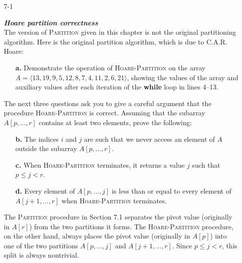 \begin{enumerate}

\item[7{-}1]{\textbf{\emph{Hoare partition correctness}}\\
The version of \textsc{Partition} given in this chapter is not the original
partitioning algorithm. Here is the original partition algorithm, which is
due to C.A.R. Hoare:

\begin{algorithm}[H]
\SetAlgoNoEnd\DontPrintSemicolon
\BlankLine
{}
\nonl{}
\end{algorithm}

\begin{enumerate}
\item[\textbf{a.}]{Demonstrate the operation of \textsc{Hoare-Partition} on the array
$A = \langle 13, 19, 9, 5, 12, 8, 7, 4, 11, 2, 6, 21 \rangle$, showing the
values of the array and auxiliary values after each iteration of the
\textbf{while} loop in lines 4{--}13.}
\end{enumerate}

The next three questions ask you to give a careful argument that the procedure
\textsc{Hoare-Partition} is correct. Assuming that the subarray $A[p, \dots, r]$
contains at least two elements, prove the following:

\begin{enumerate}
\item[\textbf{b.}]{The indices $i$ and $j$ are such that we never access an
element of $A$ outside the subarray $A[p, \dots, r]$.}
\item[\textbf{c.}]{When \textsc{Hoare-Partition} terminates, it returns a value
$j$ such that $p \le j < r$.}
\item[\textbf{d.}]{Every element of $A[p, \dots, j]$ is less than or equal to
every element of $A[j + 1, \dots, r]$ when \textsc{Hoare-Partition} terminates.}
\end{enumerate}

The \textsc{Partition} procedure in Section 7.1 separates the pivot value
(originally in $A[r]$) from the two partitions it forms. The
\textsc{Hoare-Partition} procedure, on the other hand, always places the pivot
value (originally in $A[p]$) into one of the two partitions $A[p, \dots, j]$
and $A[j + 1, \dots, r]$. Since $p \le j < r$, this split is always nontrivial.

}
\end{enumerate}
